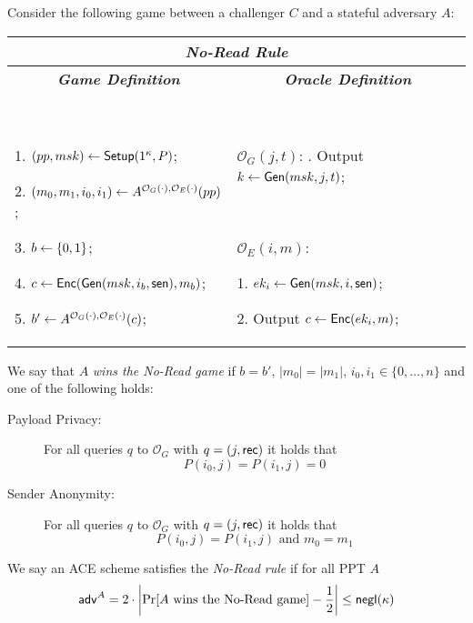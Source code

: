 \documentclass{llncs}
\begin{document}
\begin{defi} \label{def:oneprivacy}\label{def:ACEnoread} \label{def:privacy} Consider the following game between a challenger $C$ and a stateful adversary $A$:
\begin{center}
\begin{small}
    \begin{tabular}{| p{5.5cm} | p{5cm} |}
    \hline
	\multicolumn{2}{|c|}{\textbf{\emph{No-Read Rule}}} \\
	\hline
	\multicolumn{1}{|c|}{\textbf{\emph{Game Definition}}} & \multicolumn{1}{|c|}{\textbf{\emph{Oracle Definition}}}  \\
	\hline
	\

	1. $(pp,msk)\leftarrow \mathsf{Setup}(1^\kappa,P)$;

	2. $(m_0,m_1,i_0,i_1) \leftarrow A^{\mathcal{O}_G(\cdot),\mathcal{O}_E(\cdot)}(pp)$;

	3. $b\leftarrow \{0,1\}$;

	4. $c\leftarrow \mathsf{Enc}(\mathsf{Gen}(msk,i_b,\mathsf{sen}),m_b)$;

	5. $b' \leftarrow A^{\mathcal{O}_G(\cdot),\mathcal{O}_E(\cdot)}(c)$;

	&
	\

	$\mathcal{O}_G(j,t)$: \newline 1. Output $k\leftarrow \mathsf{Gen}(msk,j,t)$;

	\ 

	$\mathcal{O}_E(i,m)$: 

	1. $ek_i\leftarrow  \mathsf{Gen}(msk,i,\mathsf{sen})$;

	2. Output $c\leftarrow \mathsf{Enc}( ek_i , m)$;

	\\
	\hline
	\end{tabular}
\end{small}
\end{center}
We say that $A$ \emph{wins the No-Read game} if $b=b'$, $|m_0|=|m_1|$, $i_0,i_1\in\{0,\ldots,n\}$ and one of the following holds:
\begin{description}
	\item[Payload Privacy:] For all queries $q$ to $\mathcal{O}_G$ with $q=(j,\mathsf{rec})$ it holds that 
		$$P(i_0,j)=P(i_1,j)=0$$
	\item[Sender Anonymity:] For all queries $q$ to $\mathcal{O}_G$ with $q=(j,\mathsf{rec})$ it holds that 
		$$P(i_0,j)=P(i_1,j) \mbox{ and } m_0=m_1$$
\end{description}
We say an ACE scheme satisfies the \emph{No-Read rule} if for all PPT $A$
$$
\mathsf{adv}^{A} = 2\cdot\left|\Pr[A \mbox{ wins the No-Read game}]-\frac{1}{2}\right|\leq \mathsf{negl}(\kappa)
$$ 
\end{defi}
\end{document}

